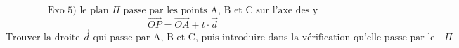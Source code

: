 \documentclass{article}
\begin{document}
\[ \text{Exo 5) le plan } \Pi \text{ passe par les points A, B et C sur l'axe des y} \]
\[ \vec{OP} = \vec{OA} + t \cdot \vec{d} \]
\[ \text{Trouver la droite } \vec{d} \text{ qui passe par A, B et C, puis introduire dans la vérification qu'elle passe par le plan} \Pi \]
\end{document}
